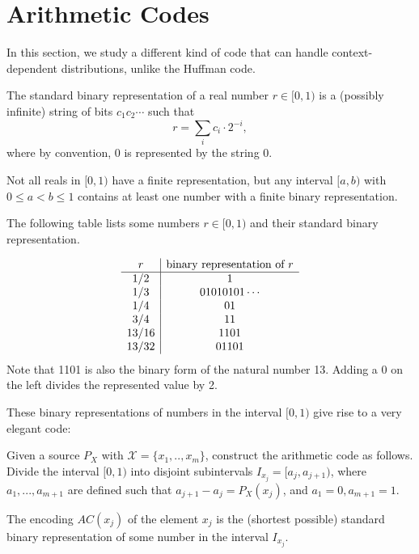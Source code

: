 \section{Arithmetic Codes}
In this section, we study a different kind of code that can handle context-dependent distributions, unlike the Huffman code.

\begin{definition}
The standard binary representation of a real number $r \in [0,1)$ is a (possibly infinite) string of bits $c_1c_2\cdots$ such that
\[
r = \sum_i c_i \cdot 2^{-i},
\]
where by convention, 0 is represented by the string 0.
\end{definition}
Not all reals in $[0,1)$ have a finite representation, but any interval $[a,b)$ with $0 \leq a < b \leq 1$ contains at least one number with a finite binary representation.
\begin{example}
The following table lists some numbers $r \in [0,1)$ and their standard binary representation.

\[
\begin{array}{c | c}
r & \mbox{binary representation of } r\\\hline
1/2 & 1\\
1/3 & 01010101\cdots\\
1/4 & 01\\
3/4 & 11\\
13/16 & 1101\\
13/32 & 01101\\
\end{array}
\]
Note that 1101 is also the binary form of the natural number 13. Adding a 0 on the left divides the represented value by 2.
\end{example}
These binary representations of numbers in the interval $[0,1)$ give rise to a very elegant code: 
\begin{definition}\label{def:arithmetic}
Given a source $P_X$ with $\mathcal{X} = \{x_1, .., x_m\}$, construct the arithmetic code as follows. Divide the interval $[0,1)$ into disjoint subintervals $I_{x_j} = [a_j, a_{j+1})$, where $a_1, ..., a_{m+1}$ are defined such that $a_{j+1} - a_j = P_X(x_j)$, and $a_1 = 0, a_{m+1} = 1$.

The encoding $AC(x_j)$ of the element $x_j$ is the (shortest possible) standard binary representation of some number in the interval $I_{x_j}$. 
\end{definition}

